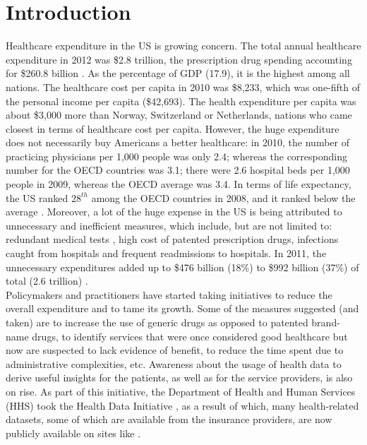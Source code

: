 \section{Introduction}
\label{sec:introduction}
Healthcare expenditure in the US is growing concern. The total annual healthcare expenditure in 2012 was \$2.8 trillion, the prescription drug spending accounting for \$260.8 billion \cite{healthaffairs}. As the percentage of GDP (17.9), it is the highest among all nations. The healthcare cost per capita in 2010 was \$8,233, which was one-fifth of the personal income per capita (\$42,693). The health expenditure per capita was about \$3,000 more than Norway, Switzerland or Netherlands, nations who came closest \cite{countrycomp} in terms of healthcare cost per capita. However, the huge expenditure does not necessarily buy Americans a better healthcare: in 2010, the number of practicing physicians per 1,000 people was only 2.4; whereas the corresponding number for the OECD countries was 3.1; there were 2.6 hospital beds per 1,000 people in 2009, whereas the OECD average was 3.4. In terms of life expectancy, the US ranked $28^{th}$ among the OECD countries in 2008, and it ranked below the average \cite{lifeex}. Moreover, a lot of the huge expense in the US is being attributed to unnecessary and inefficient measures, which include, but are not limited to: redundant medical tests \cite{seattle}, high cost of patented prescription drugs, infections caught from hospitals and frequent readmissions to hospitals. In 2011, the unnecessary expenditures added up to \$476 billion (18\%) to \$992 billion (37\%) of total (2.6 trillion) \cite{unnecessary}.\\

Policymakers and practitioners have started taking initiatives to reduce the overall expenditure and to tame its growth. Some of the measures suggested (and taken) are to increase the use of generic drugs as opposed to patented brand-name drugs, to identify services that were once considered good healthcare but now are suspected to lack evidence of benefit, to reduce the time spent due to administrative complexities, etc. Awareness about the usage of health data to derive useful insights for the patients, as well as for the service providers, is also on rise. As part of this initiative, the    
Department of Health and Human Services (HHS) took the Health Data Initiative \cite{hdi}, as a result of which, many health-related datasets, some of which are available from the insurance providers, are now publicly available on sites like \cite{healthdata}.\\

